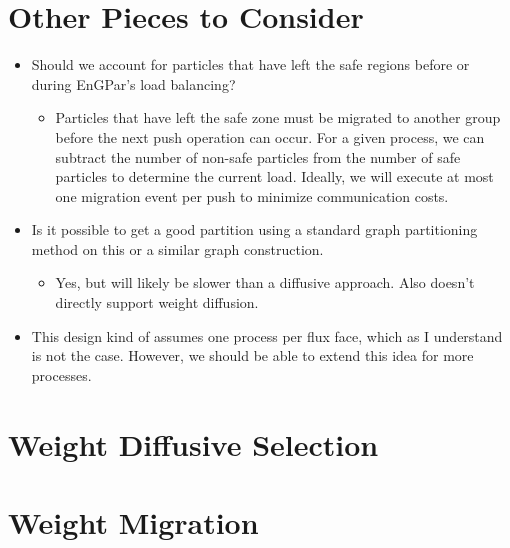 \documentclass[a4paper]{article}
\begin{document}
\section{Other Pieces to Consider}
\begin{itemize}
\item Should we account for particles that have left the safe regions before or during EnGPar's load balancing?
  {\color{red}
    \begin{itemize}
    \item Particles that have left the safe zone must be migrated to another group before the next push operation can occur. For a given process, we can subtract the number of non-safe particles from the number of safe particles to determine the current load. Ideally, we will execute at most one migration event per push to minimize communication costs.
    \end{itemize}
  }
\item Is it possible to get a good partition using a standard graph partitioning method on this or a similar graph construction.
  {\color{red}
    \begin{itemize}
    \item Yes, but will likely be slower than a diffusive approach. Also doesn't directly support weight diffusion.
    \end{itemize}
  }

  \item This design kind of assumes one process per flux face, which as I understand is not the case. However, we should be able to extend this idea for more processes.
\end{itemize}

{ \color{blue}
\section{Weight Diffusive Selection}
\label{sec:select}
\section{Weight Migration}
\label{sec:migrate}
}
\end{document}
